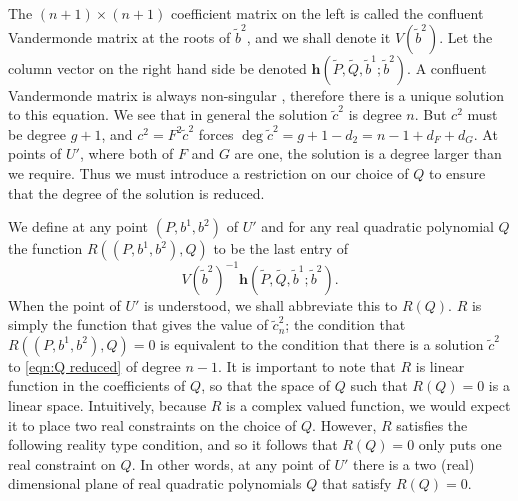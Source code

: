 The $(n+1)\times (n+1)$ coefficient matrix on the left is called the confluent Vandermonde matrix at the roots of $\tilde{b}^2$, and we shall denote it $V(\tilde{b}^2)$. Let the column vector on the right hand side be denoted $\mathbf{h}(\tilde{P},\tilde{Q},\tilde{b}^1;\tilde{b}^2)$. A confluent Vandermonde matrix is always non-singular \cite{Kalman1984}, therefore there is a unique solution to this equation. We see that in general the solution $\tilde{c}^2$ is degree $n$. But $c^2$ must be degree $g+1$, and $c^2 = F^2\tilde{c}^2 $ forces $\deg \tilde{c}^2 = g+1 - d_2 = n-1 + d_F + d_G$.
At points of $U'$, where both of $F$ and $G$ are one, the solution is a degree larger than we require. Thus we must introduce a restriction on our choice of $Q$ to ensure that the degree of the solution is reduced.


We define at any point $(P,b^1,b^2)$ of $U'$ and for any real quadratic polynomial $Q$ the function $R((P,b^1,b^2),Q)$ to be the last entry of
\[
V(\tilde{b}^2)^{-1} \mathbf{h}(\tilde{P},\tilde{Q},\tilde{b}^1;\tilde{b}^2).
\]
When the point of $U'$ is understood, we shall abbreviate this to $R(Q)$. $R$ is simply the function that gives the value of $\tilde{c}^2_n$; the condition that $R((P,b^1,b^2),Q) = 0$ is equivalent to the condition that there is a solution $\tilde{c}^2$ to \eqref{eqn:Q reduced} of degree $n-1$. It is important to note that $R$ is linear function in the coefficients of $Q$, so that the space of $Q$ such that $R(Q)=0$ is a linear space. Intuitively, because $R$ is a complex valued function, we would expect it to place two real constraints on the choice of $Q$. However, $R$ satisfies the following reality type condition, and so it follows that $R(Q)=0$ only puts one real constraint on $Q$. In other words, at any point of $U'$ there is a two (real) dimensional plane of real quadratic polynomials $Q$ that satisfy $R(Q) = 0$.

